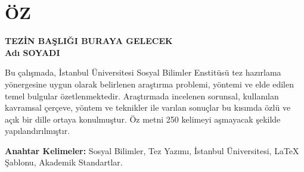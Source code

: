 
\baslatOnKisim

\chapter*{ÖZ}

\begin{center}
    {\bfseries\fontsize{14pt}{16pt}\selectfont TEZİN BAŞLIĞI BURAYA GELECEK}\\[0.4cm]
    {\bfseries Adı SOYADI}
\end{center}

\vspace{0.8cm}

Bu çalışmada, İstanbul Üniversitesi Sosyal Bilimler Enstitüsü tez hazırlama yönergesine uygun olarak belirlenen araştırma problemi, yöntemi ve elde edilen temel bulgular özetlenmektedir. Araştırmada incelenen sorunsal, kullanılan kavramsal çerçeve, yöntem ve teknikler ile varılan sonuçlar bu kısımda özlü ve açık bir dille ortaya konulmuştur. Öz metni 250 kelimeyi aşmayacak şekilde yapılandırılmıştır.

\vspace{1cm}
\noindent\textbf{Anahtar Kelimeler:} Sosyal Bilimler, Tez Yazımı, İstanbul Üniversitesi, LaTeX Şablonu, Akademik Standartlar.

\clearpage

